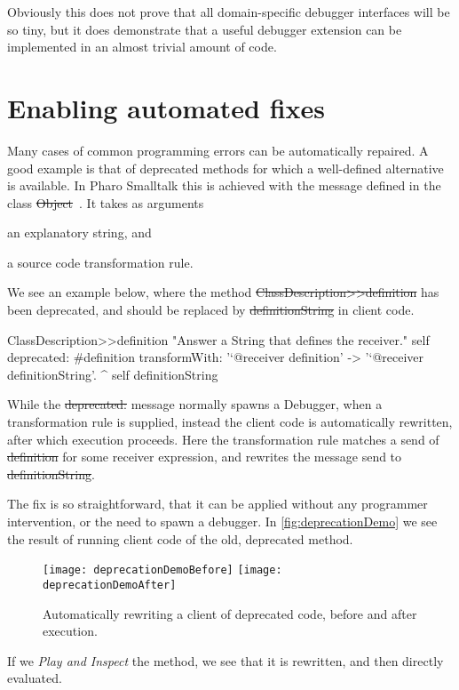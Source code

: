 \documentclass[sigplan,anonymous,review,10pt]{acmart}
\newcommand\ac[1]{\nbc{AC}{#1}{teal}}
\begin{document}
Obviously this does not prove that all domain-specific debugger interfaces will be so tiny, but it does demonstrate that a useful debugger extension can be implemented in an almost trivial amount of code.

\section{Enabling automated fixes}\label{sec:fixes}

Many cases of common programming errors can be automatically repaired.
A good example is that of deprecated methods for which a well-defined alternative is available.
In Pharo Smalltalk this is achieved with the  message defined in the class \st{Object}~\cite{Duca22a}.
It takes as arguments
\begin{inparaenum}[(i)]
	\item an explanatory string, and
	\item a source code transformation rule.
\end{inparaenum}    
We see an example below, where the method \st{ClassDescription>>definition} has been deprecated, and should be replaced by \st{definitionString} in client code.
\begin{code}
ClassDescription>>definition
	"Answer a String that defines the receiver."
	self
		deprecated: #definition
		transformWith: '`@receiver definition' -> '`@receiver definitionString'.
	^ self definitionString
\end{code}
While the \st{deprecated:} message normally spawns a Debugger, when a transformation rule is supplied, instead the client code is automatically rewritten, after which execution proceeds.
Here the transformation rule matches a send of \st{definition} for some receiver expression, and rewrites the message send to \st{definitionString}.

The fix is so straightforward, that it can be applied without any programmer intervention, or the need to spawn a debugger.
In \autoref{fig:deprecationDemo} we see the result of running client code of the old, deprecated method.
\begin{figure}[h]
  \texttt{[image: deprecationDemoBefore]}
  \texttt{[image: deprecationDemoAfter]}
  \caption{Automatically rewriting a client of deprecated code, before and after execution.}
  \label{fig:deprecationDemo}
\end{figure}
If we \emph{Play and Inspect} the method, we see that it is rewritten, and then directly evaluated.
\end{document}
